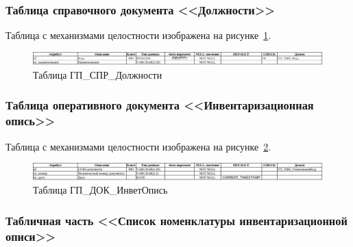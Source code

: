 
\subsubsection*{Таблица справочного документа <<Должности>>}

Таблица с механизмами целостности изображена на рисунке~\ref{fig:Logic_DE_CTL_Positions}.

\begin{figure}[!h]
    \centering

    \includegraphics[width=18cm]
    {assets/database/Types/ГП_СПР_Должности.png}

    \caption{Таблица ГП\_СПР\_Должности}

    \label{fig:Logic_DE_CTL_Positions}
\end{figure}


\subsubsection*{Таблица оперативного документа <<Инвентаризационная опись>>}

Таблица с механизмами целостности изображена на рисунке~\ref{fig:Logic_DE_DOC_InventoryList}.

\begin{figure}[!h]
    \centering

    \includegraphics[width=18cm]
    {assets/database/Types/ГП_ДОК_ИнветОпись.png}

    \caption{Таблица ГП\_ДОК\_ИнветОпись}

    \label{fig:Logic_DE_DOC_InventoryList}
\end{figure}


\subsubsection*{Табличная часть <<Список номенклатуры инвентаризационной описи>>}

